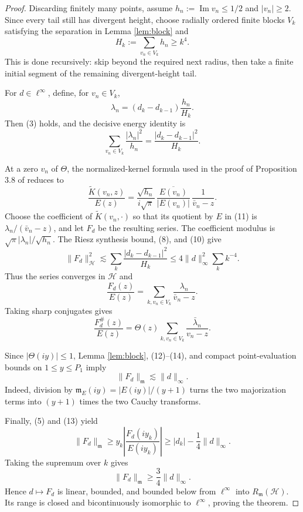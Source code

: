 \documentclass[11pt]{article}
\newcommand{\Hc}{\mathcal H}
\newcommand{\Rm}{R_{\mathfrak m}}
\newcommand{\linf}{\ell^\infty}
\begin{document}
\begin{proof}
Discarding finitely many points, assume
$h_n:=\operatorname{Im}v_n\le1/2$ and $|v_n|\ge2$.  Since every tail still
has divergent height, choose radially ordered finite blocks $V_k$ satisfying
the separation in Lemma \ref{lem:block} and
\[
 H_k:=\sum_{v_n\in V_k}h_n\ge k^4.                          \tag{8}
\]
This is done recursively: skip beyond the required next radius, then take a
finite initial segment of the remaining divergent-height tail.

For $d\in\linf$, define, for $v_n\in V_k$,
\[
 \lambda_n=(d_k-d_{k-1})\frac{h_n}{H_k}.                   \tag{9}
\]
Then (3) holds, and the decisive energy identity is
\[
 \sum_{v_n\in V_k}\frac{|\lambda_n|^2}{h_n}
 =\frac{|d_k-d_{k-1}|^2}{H_k}.                             \tag{10}
\]

At a zero $v_n$ of $\Theta$, the normalized-kernel formula used in the proof
of Proposition 3.8 of \cite{BW} reduces to
\[
 \frac{\widetilde K(v_n,z)}{E(z)}
 =\frac{\sqrt{h_n}}{i\sqrt\pi}\,
   \frac{\overline{E(v_n)}}{|E(v_n)|}\,
   \frac1{\bar v_n-z}.                                    \tag{11}
\]
Choose the coefficient of $\widetilde K(v_n,\cdot)$ so that its quotient by
$E$ in (11) is $\lambda_n/(\bar v_n-z)$, and let $F_d$ be the resulting
series.  The coefficient modulus is
$\sqrt\pi|\lambda_n|/\sqrt{h_n}$.  The Riesz synthesis bound, (8), and
(10) give
\[
 \|F_d\|_{\Hc}^2
 \lesssim\sum_k\frac{|d_k-d_{k-1}|^2}{H_k}
 \le4\|d\|_\infty^2\sum_k k^{-4}.                         \tag{12}
\]
Thus the series converges in $\Hc$ and
\[
 \frac{F_d(z)}{E(z)}=\sum_{k,v_n\in V_k}
       \frac{\lambda_n}{\bar v_n-z}.                      \tag{13}
\]
Taking sharp conjugates gives
\[
 \frac{F_d^\#(z)}{E(z)}
 =\Theta(z)\sum_{k,v_n\in V_k}
       \frac{\bar\lambda_n}{v_n-z}.                       \tag{14}
\]

Since $|\Theta(iy)|\le1$, Lemma \ref{lem:block}, (12)--(14), and compact
point-evaluation bounds on $1\le y\le P_1$ imply
\[
 \|F_d\|_{\mathfrak m}\lesssim\|d\|_\infty.             \tag{15}
\]
Indeed, division by $\mathfrak m_E(iy)=|E(iy)|/(y+1)$ turns the two
majorization terms into $(y+1)$ times the two Cauchy transforms.

Finally, (5) and (13) yield
\[
 \|F_d\|_{\mathfrak m}
 \ge y_k\left|\frac{F_d(iy_k)}{E(iy_k)}\right|
 \ge |d_k|-\frac14\|d\|_\infty.
\]
Taking the supremum over $k$ gives
\[
 \|F_d\|_{\mathfrak m}\ge\frac34\|d\|_\infty.          \tag{16}
\]
Hence $d\mapsto F_d$ is linear, bounded, and bounded below from $\linf$
into $\Rm(\Hc)$.  Its range is closed and bicontinuously isomorphic to
$\linf$, proving the theorem.
\end{proof}
\end{document}
